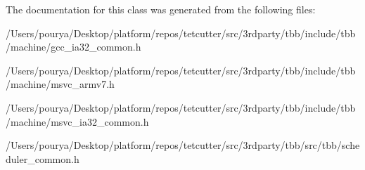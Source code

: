 The documentation for this class was generated from the following files\+:\begin{DoxyCompactItemize}
\item 
/\+Users/pourya/\+Desktop/platform/repos/tetcutter/src/3rdparty/tbb/include/tbb/machine/gcc\+\_\+ia32\+\_\+common.\+h\item 
/\+Users/pourya/\+Desktop/platform/repos/tetcutter/src/3rdparty/tbb/include/tbb/machine/msvc\+\_\+armv7.\+h\item 
/\+Users/pourya/\+Desktop/platform/repos/tetcutter/src/3rdparty/tbb/include/tbb/machine/msvc\+\_\+ia32\+\_\+common.\+h\item 
/\+Users/pourya/\+Desktop/platform/repos/tetcutter/src/3rdparty/tbb/src/tbb/scheduler\+\_\+common.\+h\end{DoxyCompactItemize}
